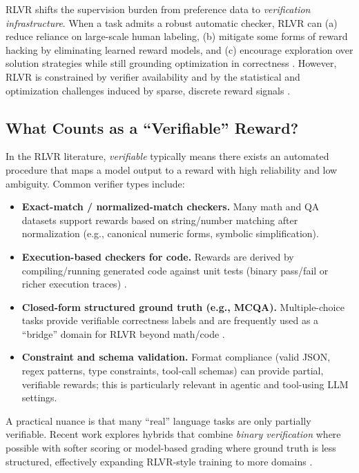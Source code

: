 \documentclass[sigconf]{acmart}
\begin{document}
RLVR shifts the supervision burden from preference data to \emph{verification infrastructure}.
When a task admits a robust automatic checker, RLVR can (a) reduce reliance on large-scale human labeling, (b) mitigate some forms of reward hacking by eliminating learned reward models, and (c) encourage exploration over solution strategies while still grounding optimization in correctness \cite{guo2025deepseekr1,wen2025rlvr,cho2025safetycapability}.
However, RLVR is constrained by verifier availability and by the statistical and optimization challenges induced by sparse, discrete reward signals \cite{wei2025redit,wang2026verpo}.

\subsection{What Counts as a ``Verifiable'' Reward?}

In the RLVR literature, \emph{verifiable} typically means there exists an automated procedure that maps a model output to a reward with high reliability and low ambiguity.
Common verifier types include:

\begin{itemize}
  \item \textbf{Exact-match / normalized-match checkers.}
  Many math and QA datasets support rewards based on string/number matching after normalization (e.g., canonical numeric forms, symbolic simplification).
  \item \textbf{Execution-based checkers for code.}
  Rewards are derived by compiling/running generated code against unit tests (binary pass/fail or richer execution traces) \cite{le2022coderl,wang2026verpo}.
  \item \textbf{Closed-form structured ground truth (e.g., MCQA).}
  Multiple-choice tasks provide verifiable correctness labels and are frequently used as a ``bridge'' domain for RLVR beyond math/code \cite{zhang2025medrlvr}.
  \item \textbf{Constraint and schema validation.}
  Format compliance (valid JSON, regex patterns, type constraints, tool-call schemas) can provide partial, verifiable rewards; this is particularly relevant in agentic and tool-using LLM settings.
\end{itemize}

A practical nuance is that many ``real'' language tasks are only partially verifiable.
Recent work explores hybrids that combine \emph{binary verification} where possible with softer scoring or model-based grading where ground truth is less structured, effectively expanding RLVR-style training to more domains \cite{su2025crossingrewardbridge}.
\end{document}
